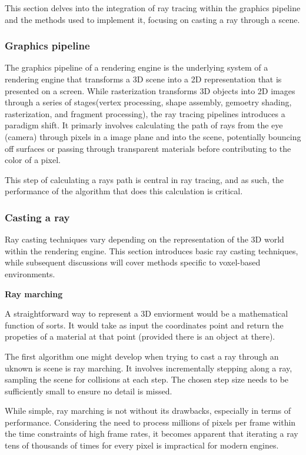 This section delves into the integration of ray tracing within the graphics pipeline and the methods used to implement it, focusing on casting a ray through a scene.

\subsubsection{Graphics pipeline}
The graphics pipeline of a rendering engine is the underlying system of a rendering engine that transforms a 3D scene into a 2D representation that is presented on a screen. While rasterization transforms 3D objects into 2D images through a series of stages(vertex processing, shape assembly, gemoetry shading, rasterization, and fragment processing), the ray tracing pipelines introduces a paradigm shift. It primarly involves calculating the path of rays from the eye (camera) through pixels in a image plane and into the scene, potentially bouncing off surfaces or passing through transparent materials before contributing to the color of a pixel.

This step of calculating a rays path is central in ray tracing, and as such, the performance of the algorithm that does this calculation is critical.
\subsubsection{Casting a ray}
Ray casting techniques vary depending on the representation of the 3D world within the rendering engine.
This section introduces basic ray casting techniques, while subsequent discussions will cover methods specific to voxel-based environments.

\vspace{0.5cm}
\textbf{Ray marching}

A straightforward way to represent a 3D enviorment would be a mathematical function of sorts.
It would take as input the coordinates point and return the propeties of a material at that point (provided there is an object at there).

The first algorithm one might develop when trying to cast a ray through an uknown is scene is ray marching.
It involves incrementally stepping along a ray, sampling the scene for collisions at each step.
The chosen step size needs to be sufficiently small to ensure no detail is missed.

While simple, ray marching is not without its drawbacks, especially in terms of performance.
Considering the need to process millions of pixels per frame within the time constraints of high frame rates, it becomes apparent that iterating a ray tens of thousands of times for every pixel is impractical for modern engines.


